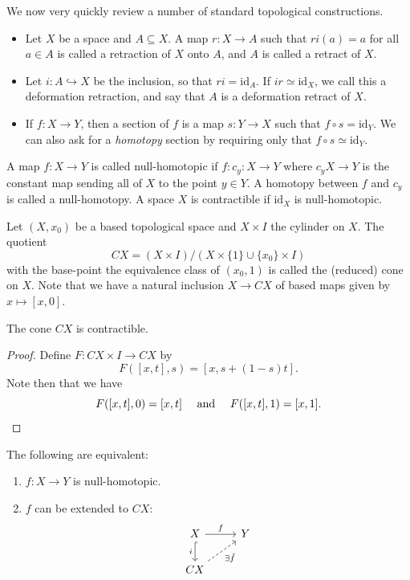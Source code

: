 \documentclass[ma3408.tex]{subfiles}
\begin{document}
\begin{Rem}
We now very quickly review a number of standard topological constructions. 
\begin{itemize}
	\item Let $X$ be a space and $A \subseteq X$. A map $r \colon X \to A$ such that $ri(a) = a$ for all $a \in A$ is called a retraction of $X$ onto $A$, and $A$ is called a retract of $X$. 
	\item Let $i \colon A \hookrightarrow X$ be the inclusion, so that $ri = \text{id}_A$. If $ir \simeq \text{id}_X$, we call this a deformation retraction, and say that $A$ is a deformation retract of $X$. 
	\item If $f \colon X \to Y$, then a section of $f$ is a map $s \colon Y \to X$ such that $f \circ s = \text{id}_Y$. We can also ask for a \emph{homotopy} section by requiring only that $f \circ s \simeq \text{id}_Y$. 
\end{itemize}
\end{Rem}
\begin{Def}
A map $f \colon X \to Y$ is called null-homotopic if $f \colon c_y \colon X \to Y$ where $c_y X \to Y$ is the constant map sending all of $X$ to the point $y \in Y$. A homotopy between $f$ and $c_y$ is called a null-homotopy. A space $X$ is contractible if $\text{id}_X$ is null-homotopic. 
\end{Def}
\begin{Def}
Let $(X,x_0)$ be a based topological space and $X \times I$ the cylinder on $X$. The quotient
\[
CX = (X \times I)/(X \times \{ 1 \} \cup \{ x_0 \} \times I)
\]
with the base-point the equivalence class of $(x_0,1)$ is called the (reduced) cone on $X$. Note that we have a natural inclusion $X \to CX$ of based maps given by $x \mapsto [x,0]$. 
\end{Def}
\begin{Lem}\label{lem:cone_is_contractible}
The cone $CX$ is contractible. 
\end{Lem}
\begin{proof}
Define $F \colon CX \times I \to CX$ by
\[
F([x,t],s) = [x,s+(1-s)t]. 
\]
Note then that we have
\[
F([x,t],0) = [x,t] \quad \text{ and } \quad F([x,t],1) = [x,1]. \qedhere
\]

\end{proof}
\begin{Lem}
The following are equivalent:
\begin{enumerate}[label=(\roman*)]
	\item $f \colon X \to Y$ is null-homotopic. 
	\item $f$ can be extended to $CX$:
\[\begin{tikzcd}
	X & Y \\
	CX
	\arrow["f", from=1-1, to=1-2]
	\arrow["i"', hook, from=1-1, to=2-1]
	\arrow["{\exists \tilde f}"', dashed, from=2-1, to=1-2]
\end{tikzcd}\]
\end{enumerate}
\end{Lem}
\end{document}
